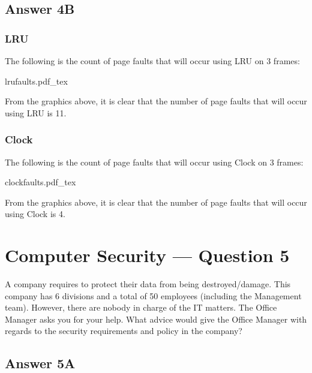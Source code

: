 \documentclass[
  11pt, %
]{assignment}
\newcommand{\incfig}[1]{%
    \def\svgwidth{\columnwidth}
    {#1.pdf_tex}
}
\begin{document}
\subsection*{Answer 4B}

\subsubsection*{LRU}

The following is the count of page faults that will occur using LRU on 3 frames:

\medskip

\begin{center}
	\footnotesize
	\incfig{lrufaults}
\end{center}

From the graphics above, it is clear that the number of page faults that will occur using LRU is 11.

\subsubsection*{Clock}

The following is the count of page faults that will occur using Clock on 3 frames:

\begin{center}
	\footnotesize
	\incfig{clockfaults}
\end{center}

From the graphics above, it is clear that the number of page faults that will occur using Clock is 4.

\section*{Computer Security --- Question 5}

\begin{problem}
A company requires to protect their data from being destroyed/damage. This company has 6 divisions and a total of 50 employees (including the Management team). However, there are nobody in charge of the IT matters. The Office Manager asks you for your help. What advice would give the Office Manager with regards to the security requirements and policy in the company?
\end{problem}

\subsection*{Answer 5A}
\end{document}
